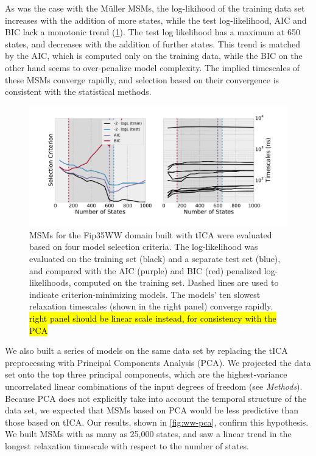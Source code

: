 \documentclass[journal=jpcbfk, layout=traditional, manuscript=article]{achemso}
\begin{document}
As was the case with the M\"{u}ller MSMs, the log-likihood of the training data set increases with the addition of more states, while the test log-likelihood, AIC and BIC lack a monotonic trend (\cref{fig:ww-tica}). The test log likelihood has a maximum at 650 states, and decreases with the addition of further states. This trend is matched by the AIC, which is computed only on the training data, while the BIC on the other hand seems to over-penalize model complexity. The implied timescales of these MSMs converge rapidly, and selection based on their convergence is consistent with the statistical methods.

\begin{figure}
\centering
\label{fig:ww-tica}
\includegraphics[width=6in]{figs/ww_tica/ww_tica.pdf}

\caption{MSMs for the Fip35WW domain built with tICA were evaluated based on four model selection criteria. The log-likelihood was evaluated on the training set (black) and a separate test set (blue), and compared with the AIC (purple) and BIC (red) penalized log-likelihoods, computed on the training set. Dashed lines are used to indicate criterion-minimizing models. The models' ten slowest relaxation timescales (shown in the right panel) converge rapidly. \hl{right panel should be linear scale instead, for consistency with the PCA}}
\end{figure}

We also built a series of models on the same data set by replacing the tICA preprocessing with Principal Components Analysis (PCA). We projected the data set onto the top three principal components, which are the highest-variance uncorrelated linear combinations of the input degrees of freedom (see \emph{Methods}). Because PCA does not explicitly take into account the temporal structure of the data set, we expected that MSMs based on PCA would be less predictive than those based on tICA. Our results, shown in \cref{fig:ww-pca}, confirm this hypothesis. We built MSMs with as many as 25,000 states, and saw a linear trend in the longest relaxation timescale with respect to the number of states.
\end{document}

